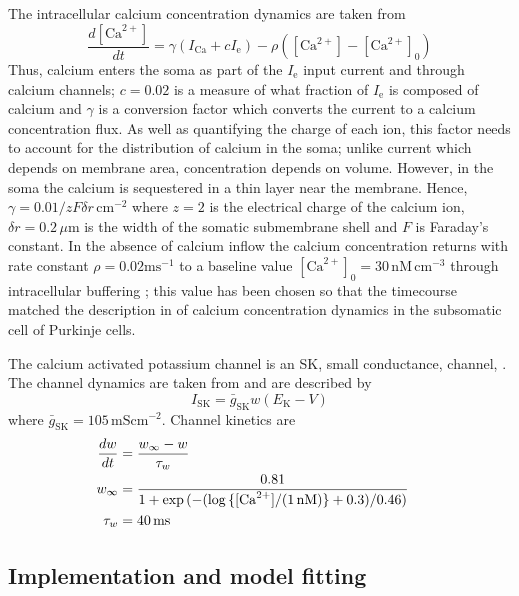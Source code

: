 \documentclass[twocolumn]{svjour3}          %
\newcommand{\msi}{\,\mathrm{mS cm^{-2}}}
\newcommand{\mse}{\,\mathrm{ms}}
\newcommand{\cm}{\,\mathrm{cm}}
\renewcommand{\k}{\mathrm{K}}
\newcommand{\ca}{\mathrm{Ca}}
\newcommand{\sk}{\mathrm{SK}}
\begin{document}
The intracellular calcium concentration dynamics are taken from
\citet{SterrattEtAl2012,KochSegev1998}
\begin{equation}
\label{eq:ca_concentration}
\frac{d[\ca^{2+}]}{dt}=\gamma (I_\ca+cI_{\mathrm{e}})  -
\rho ([\ca^{2+}]-[\ca^{2+}]_0)
\end{equation}
Thus, calcium enters the soma as part of the $I_\mathrm{e}$ input
current and through calcium channels; $c=0.02$ is a measure of what
fraction of $I_{\mathrm{e}}$ is composed of calcium and $\gamma$ is a
conversion factor which converts the current to a calcium
concentration flux. As well as quantifying the charge of each ion,
this factor needs to account for the distribution of calcium in the
soma; unlike current which depends on membrane area, concentration
depends on volume. However, in the soma the calcium is sequestered in
a thin layer near the membrane. Hence, $\gamma=0.01/zF\delta
r\,\mathrm{cm}^{-2}$ where $z=2$ is the electrical charge of the
calcium ion, $\delta r=0.2\,\mu\mathrm{m}$ is the width of the somatic
submembrane shell and $F$ is Faraday's constant. In the absence of
calcium inflow the calcium concentration returns with rate constant
$\rho=0.02\mathrm{ms}^{-1}$ to a baseline value $[\ca^{2+}]_0
=30\,\mathrm{nM}\cm^{-3}$ through intracellular buffering
\citep{FierroEtAl1998,AiraksinenEtAl1997}; this value has been chosen
so that the timecourse matched the description in
\citet{EilersEtAl1995} of calcium concentration dynamics in the
subsomatic cell of Purkinje cells.

The calcium activated potassium channel is an SK, small conductance,
channel, \citep{LancasterEtAl1991}. The channel dynamics are taken from
\citet{GilliesWillshaw2006} and are described by
\begin{equation}
\label{eq:I_SK}
I_{\sk} = {\bar{g}_{\sk}}w(E_\k-V)
\end{equation}
where $\bar{g}_\sk = 105\msi$. Channel kinetics are
\begin{align}
\label{eq:w_kinetics}
\frac{dw}{dt} &= \frac{w_\infty- w}{\tau_w}\cr
w_{\infty}   &= \frac{0.81}{1 + \exp{(-(\log{\{[\ca^{2+}]/(1\,\mathrm{nM})\}}+0.3)/0.46)}}\cr
\tau_w &= 40 \mse
\end{align}

\subsection{Implementation and model fitting}
\end{document}
